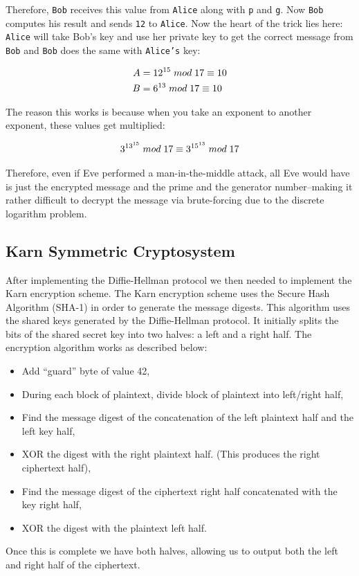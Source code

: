 \documentclass[10pt]{article}
\begin{document}
Therefore, \texttt{Bob} receives this value from \texttt{Alice} along with
\texttt{p} and \texttt{g}. Now \texttt{Bob} computes his result and sends
\texttt{12} to \texttt{Alice}. Now the heart of the trick lies here:
\texttt{Alice} will take Bob's key and use her private key to get the correct
message from \texttt{Bob} and \texttt{Bob} does the same with \texttt{Alice's}
key:

\begin{align*}
    A &= 12^{15} \thickspace mod \thickspace 17 \equiv 10 \\
    B &= 6^{13} \thickspace  mod \thickspace 17 \equiv 10
\end{align*}

The reason this works is because when you take an exponent to another exponent, these values get
multiplied:

\begin{align*}
    3^{13^{15}} \thickspace mod \thickspace 17 \equiv 3^{15^{13}} \thickspace mod \thickspace 17
\end{align*}

Therefore, even if Eve performed a man-in-the-middle attack, all Eve would have
is just the encrypted message and the prime and the generator number--making it
rather difficult to decrypt the message via brute-forcing due to the discrete
logarithm problem.

\subsection{Karn Symmetric Cryptosystem}
After implementing the Diffie-Hellman protocol we then needed to implement the
Karn encryption scheme. The Karn encryption scheme uses the Secure Hash
Algorithm (SHA-1) in order to generate the message digests. This algorithm uses
the shared keys generated by the Diffie-Hellman protocol. It initially splits
the bits of the shared secret key into two halves: a left and a right half. The
encryption algorithm works as described below:
\begin{itemize}
    \item Add ``guard'' byte of value 42,
    \item During each block of plaintext, divide block of plaintext into
          left/right half,
    \item Find the message digest of the concatenation of the left plaintext
          half and the left key half,
    \item XOR the digest with the right plaintext half. (This produces the
          right ciphertext half),
    \item Find the message digest of the ciphertext right half concatenated
          with the key right half,
    \item XOR the digest with the plaintext left half.
\end{itemize}
Once this is complete we have both halves, allowing us to output both the left
and right half of the ciphertext.
\end{document}
